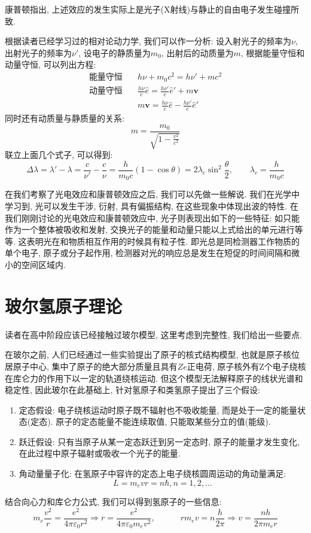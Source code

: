 
康普顿指出, 上述效应的发生实际上是光子(X射线)与静止的自由电子发生碰撞所致.

根据读者已经学习过的相对论动力学, 我们可以作一分析: 设入射光子的频率为$\nu$, 出射光子的频率为$\nu'$, 设电子的静质量为$m_0$, 出射后的动质量为$m$, 根据能量守恒和动量守恒, 可以列出方程:
\begin{align*}
\text{能量守恒} \quad & h\nu + m_0c^2 = h\nu' + mc^2 \\
\text{动量守恒} \quad & \frac{h\nu}{c}\hat{e} = \frac{h\nu'}{c}\hat{e}' + m\bm{v} \\
& m\bm{v} = \frac{h\nu}{c}\hat{e} - \frac{h\nu'}{c}\hat{e}'
\end{align*}
同时还有动质量与静质量的关系:
\[
m = \frac{m_0}{\sqrt{1-\frac{v^2}{c^2}}}
\]
联立上面几个式子, 可以得到:
\[
\Delta \lambda = \lambda' - \lambda = \frac{c}{\nu'}-\frac{c}{\nu}=\frac{h}{m_0c}(1-\cos\theta)=2\lambda_c\sin^2\frac{\theta}{2},\qquad\lambda_c=\frac{h}{m_0c}
\]

在我们考察了光电效应和康普顿效应之后, 我们可以先做一些解说. 我们在光学中学习到, 光可以发生干涉, 衍射, 具有偏振结构, 在这些现象中体现出波的特性. 在我们刚刚讨论的光电效应和康普顿效应中, 光子则表现出如下的一些特征: 如只能作为一个整体被吸收和发射, 交换光子的能量和动量只能以上式给出的单元进行等等. 这表明光在和物质相互作用的时候具有粒子性. 即光总是同检测器工作物质的单个电子, 原子或分子起作用, 检测器对光的响应总是发生在短促的时间间隔和微小的空间区域内.

\section{玻尔氢原子理论}
读者在高中阶段应该已经接触过玻尔模型, 这里考虑到完整性, 我们给出一些要点.

在玻尔之前, 人们已经通过一些实验提出了原子的核式结构模型, 也就是原子核位居原子中心, 集中了原子的绝大部分质量且具有$Ze$正电荷, 原子核外有Z个电子绕核在库仑力的作用下以一定的轨道绕核运动. 但这个模型无法解释原子的线状光谱和稳定性, 因此玻尔在此基础上, 针对氢原子和类氢原子提出了三个假设:
\begin{enumerate}
  \item 定态假设: 电子绕核运动时原子既不辐射也不吸收能量, 而是处于一定的能量状态(定态). 原子的定态能量不能连续取值, 只能取某些分立的值(能级).
  \item 跃迁假设: 只有当原子从某一定态跃迁到另一定态时, 原子的能量才发生变化, 在此过程中原子辐射或吸收一个光子的能量.
  \item 角动量量子化: 在氢原子中容许的定态上电子绕核圆周运动的角动量满足:
  \[
  L = m_e vr = n \hbar, n=1, 2, \dots
  \]
\end{enumerate}
结合向心力和库仑力公式, 我们可以得到氢原子的一些信息:
\[
m_e \frac{v^2}{r} = \frac{e^2}{4 \pi \varepsilon_0 r^2} \Rightarrow r = \frac{e^2}{4 \pi \varepsilon_0 m_e v^2}, \quad
\qquad r m_e v = n \frac{h}{2\pi} \Rightarrow v = \frac{nh}{2\pi m_e r}
\]


